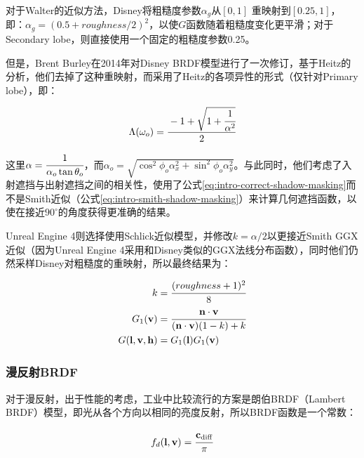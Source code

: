 \noindent 对于Walter的近似方法，Disney将粗糙度参数$\alpha_g$从$[0,1]$ 重映射到$[0.25,1]$，即：$\alpha_g=(0.5+roughness/2)^2$，以使$G$函数随着粗糙度变化更平滑；对于Secondary lobe，则直接使用一个固定的粗糙度参数0.25。

但是，Brent Burley在2014\cite{a:ExtendingtheDisneyBRDFtoaBSDFwithIntegratedSubsurfaceScattering}年对Disney BRDF模型进行了一次修订，基于Heitz\cite{a:UnderstandingtheMaskingShadowingFunctioninMicrofacetBasedBRDFs}的分析，他们去掉了这种重映射，而采用了Heitz的各项异性的形式（仅针对Primary lobe），即：

\begin{equation}
	\Lambda (\omega_o)= \cfrac{-1+\sqrt{1+ \cfrac{1}{\alpha^2}}}{2}
\end{equation}

\noindent 这里$\alpha= \cfrac{1}{\alpha_o \tan \theta_o}$，而$\alpha_o=\sqrt{\cos^2 \phi_o \alpha^2_x + \sin^2\phi_o \alpha^2_y}$。与此同时，他们考虑了入射遮挡与出射遮挡之间的相关性，使用了公式\ref{eq:intro-correct-shadow-masking}而不是Smith近似（公式\ref{eq:intro-smith-shadow-masking}）来计算几何遮挡函数，以使在接近$90^{\circ}$的角度获得更准确的结果。

Unreal Engine 4\cite{a:RealShadinginUnrealEngine4}则选择使用Schlick\cite{a:AnInexpensiveBRDFModelforPhysically-BasedRendering}近似模型，并修改$k=\alpha /2$以更接近Smith GGX近似（因为Unreal Engine 4采用和Disney类似的GGX法线分布函数），同时他们仍然采样Disney对粗糙度的重映射，所以最终结果为：

\begin{equation}
	\begin{aligned}
		k&= \cfrac{(roughness+1)^2}{8}\\
		G_1(\mathbf{v})&= \cfrac{\mathbf{n}\cdot\mathbf{v}}{(\mathbf{n}\cdot\mathbf{v})(1-k)+k}\\
		G(\mathbf{l},\mathbf{v},\mathbf{h})&=G_1(\mathbf{l})G_1(\mathbf{v})
	\end{aligned}
\end{equation}





\subsubsection{漫反射BRDF}
对于漫反射，出于性能的考虑，工业中比较流行的方案是朗伯BRDF（Lambert BRDF）模型，即光从各个方向以相同的亮度反射，所以BRDF函数是一个常数：

\begin{equation}\label{eq:intro-lambert-diff}
	f_{d}(\mathbf{l},\mathbf{v})= \cfrac{\mathbf{c}_{\rm diff}}{\pi}
\end{equation}

